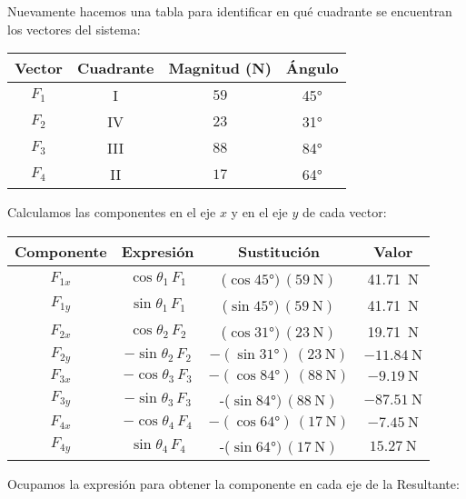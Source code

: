 \documentclass[14pt]{extarticle}
\begin{document}
Nuevamente hacemos una tabla para identificar en qué cuadrante se encuentran los vectores del sistema:
\begin{table}
    \centering
    \begin{tabular}{c | c | c | c}
        Vector & Cuadrante & Magnitud (\unit{\newton}) & Ángulo \\ \hline
        $F_{1}$ & I & $59$ & \ang{45} \\ \hline
        $F_{2}$ & IV & $23$ & \ang{31} \\ \hline
        $F_{3}$ & III & $88$ & \ang{84} \\ \hline        
        $F_{4}$ & II & $17$ & \ang{64} \\ \hline        
    \end{tabular}
\end{table}
Calculamos las componentes en el eje $x$ y en el eje $y$ de cada vector:
\begin{table}[H]
    \centering
    \begin{tabular}{c | c | c | c}
        Componente & Expresión & Sustitución & Valor \\ \hline
        $F_{1x}$ & $\cos \theta_{1} \, F_{1}$ & ($\cos \ang{45}) \, (\SI{59}{\newton})$ & \SI{41.71}{\newton} \\ \hline
        $F_{1y}$ & $\sin \theta_{1} \, F_{1}$ & ($\sin \ang{45}) \, (\SI{59}{\newton})$ & \SI{41.71}{\newton} \\ \hline
        $F_{2x}$ & $\cos \theta_{2} \, F_{2}$ & ($\cos \ang{31}) \, (\SI{23}{\newton})$ & \SI{19.71}{\newton} \\ \hline
        $F_{2y}$ & $-\sin \theta_{2} \, F_{2}$ & $-(\sin \ang{31}) \, (\SI{23}{\newton})$ & $-\SI{11.84}{\newton}$ \\ \hline
        $F_{3x}$ & $-\cos \theta_{3} \, F_{3}$ & $-(\cos \ang{84}) \, (\SI{88}{\newton})$ & $-\SI{9.19}{\newton}$ \\ \hline
        $F_{3y}$ & $-\sin \theta_{3} \, F_{3}$ & -($\sin \ang{84}) \, (\SI{88}{\newton})$ & $-\SI{87.51}{\newton}$ \\ \hline
        $F_{4x}$ & $-\cos \theta_{4} \, F_{4}$ & $-(\cos \ang{64}) \, (\SI{17}{\newton})$ & $-\SI{7.45}{\newton}$ \\ \hline
        $F_{4y}$ & $\sin \theta_{4} \, F_{4}$ & -($\sin \ang{64}) \, (\SI{17}{\newton})$ & $\SI{15.27}{\newton}$ \\ \hline        
    \end{tabular}
\end{table}
Ocupamos la expresión para obtener la componente en cada eje de la Resultante:
\end{document}
